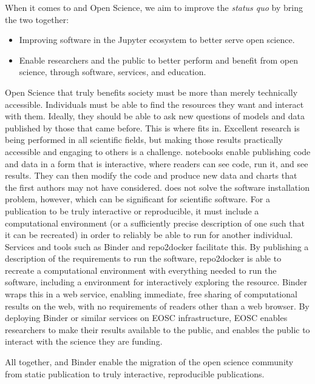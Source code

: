 When it comes to \Jupyter and Open Science,
we aim to improve the \textit{status quo} by bring the two together:

\begin{itemize}
    \item Improving software in the Jupyter ecosystem to better serve open science.
    \item Enable researchers and the public to better perform and benefit from open science, through software, services, and education.
\end{itemize}

Open Science that truly benefits society must be more than merely technically accessible.
Individuals must be able to find the resources they want and interact with them.
Ideally, they should be able to ask new questions of models and data published by those that came before.
This is where \TheProject fits in.
Excellent research is being performed in all scientific fields,
but making those results practically accessible and engaging to others is a challenge.
\Jupyter notebooks enable publishing code and data in a form that is interactive,
where readers can see code, run it, and see results.
They can then modify the code and produce new data and charts that the first authors may not have considered.
\Jupyter does not solve the software installation problem, however,
which can be significant for scientific software.
For a publication to be truly interactive or reproducible,
it must include a computational environment
(or a sufficiently precise description of one such that it can be recreated)
in order to reliably be able to run for another individual.
Services and tools such as Binder and repo2docker facilitate this.
By publishing a description of the requirements to run the software,
repo2docker is able to recreate a computational environment with everything needed to run the software,
including a \Jupyter environment for interactively exploring the resource.
Binder wraps this in a web service, enabling immediate, free sharing of computational results on the web,
with no requirements of readers other than a web browser.
By deploying Binder or similar services on EOSC infrastructure,
EOSC enables researchers to make their results available to the public,
and enables the public to interact with the science they are funding.

All together, \Jupyter and Binder enable the migration of the open science community from static publication to truly interactive, reproducible publications.


